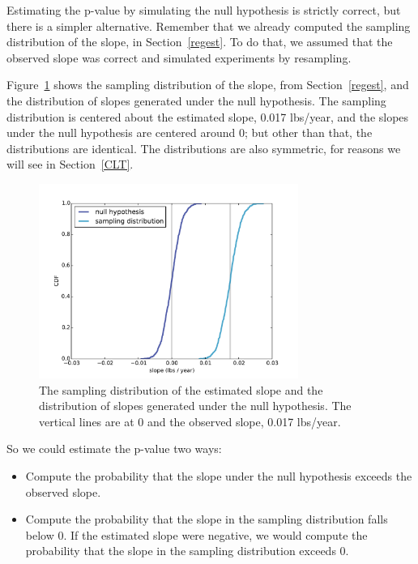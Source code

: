 \documentclass[12pt]{book}
\begin{document}
Estimating the p-value by simulating the null hypothesis is strictly
correct, but there is a simpler alternative.  Remember that we already
computed the sampling distribution of the slope, in
Section~\ref{regest}.  To do that, we assumed that the observed slope
was correct and simulated experiments by resampling.

Figure~\ref{linear4} shows the sampling distribution of the
slope, from Section~\ref{regest}, and the distribution of slopes
generated under the null hypothesis.  The sampling distribution
is centered about the estimated slope, 0.017 lbs/year, and the slopes
under the null hypothesis are centered around 0; but other than
that, the distributions are identical.  The distributions are
also symmetric, for reasons we will see in Section~\ref{CLT}.

\begin{figure}
\centerline{\includegraphics[height=2.5in]{figs/linear4.pdf}}
\caption{The sampling distribution of the estimated
slope and the distribution of slopes
generated under the null hypothesis.  The vertical lines are at 0
and the observed slope, 0.017 lbs/year.}
\label{linear4}
\end{figure}

So we could estimate the p-value two ways:

\begin{itemize}

\item Compute the probability that the slope under the null
hypothesis exceeds the observed slope.

\item Compute the probability that the slope in the sampling
distribution falls below 0.  If the estimated slope were negative,
we would compute the probability that the slope in the sampling
distribution exceeds 0.

\end{itemize}
\end{document}
